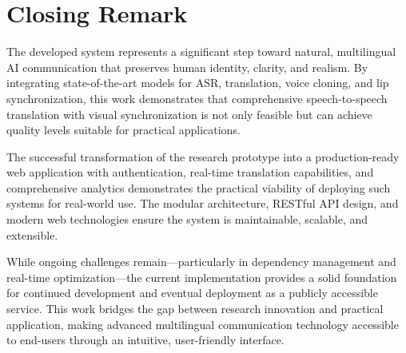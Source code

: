 \documentclass[12pt,oneside]{report}
\begin{document}
\section{Closing Remark}

The developed system represents a significant step toward natural, multilingual AI communication that preserves human identity, clarity, and realism. By integrating state-of-the-art models for ASR, translation, voice cloning, and lip synchronization, this work demonstrates that comprehensive speech-to-speech translation with visual synchronization is not only feasible but can achieve quality levels suitable for practical applications.

The successful transformation of the research prototype into a production-ready web application with authentication, real-time translation capabilities, and comprehensive analytics demonstrates the practical viability of deploying such systems for real-world use. The modular architecture, RESTful API design, and modern web technologies ensure the system is maintainable, scalable, and extensible.

While ongoing challenges remain—particularly in dependency management and real-time optimization—the current implementation provides a solid foundation for continued development and eventual deployment as a publicly accessible service. This work bridges the gap between research innovation and practical application, making advanced multilingual communication technology accessible to end-users through an intuitive, user-friendly interface.


\nocite{*}
\printbibliography
\end{document}
